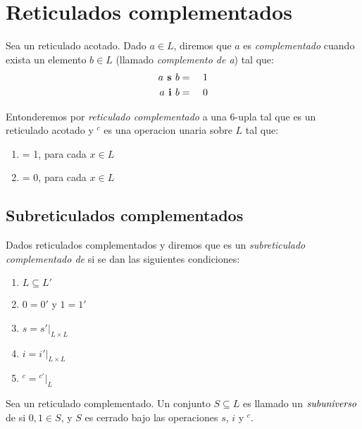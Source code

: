   \section{Reticulados complementados}
  \begin{definition}
    Sea \reticulAcot un reticulado acotado. Dado $a \in L$, diremos que $a$ es \emph{complementado} cuando 
    exista un elemento $b \in L$ (llamado \emph{complemento de a}) tal que:
    \begin{alignat*}{4}
      a\textbf{ s }b &=&\ & 1\\
      a\textbf{ i }b &=&\ & 0
    \end{alignat*}
  \end{definition}

  \begin{definition}
    Entonderemos por \emph{reticulado complementado} a una 6-upla \reticulCompl tal que \reticulAcot es un
    reticulado acotado y ${}^c$ es una operacion unaria sobre $L$ tal que:
    \begin{enumerate}
      \item {} = 1, para cada $x \in L$
      \item {} = 0, para cada $x \in L$
    \end{enumerate}
  \end{definition}

  \subsection{Subreticulados complementados}
  \begin{definition}
    Dados reticulados complementados \reticulCompl y  diremos que
    \reticulCompl es un \emph{subreticulado complementado de}  si se
    dan las siguientes condiciones:
    \begin{enumerate}
      \item $L \subseteq L'$
      \item $0 = 0'$ y $1 = 1'$
      \item $s = s'\vert_{L \times L}$
      \item $i = i'\vert_{L \times L}$
      \item ${}^c = {}^{c'}\vert_L$
    \end{enumerate}

    Sea \reticulCompl un reticulado complementado. Un conjunto $S \subseteq L$ es llamado un $\emph{subuniverso}$ de
    \reticulCompl si $0, 1 \in S$, y $S$ es cerrado bajo las operaciones $s$, $i$ y ${}^c$.
  \end{definition}

